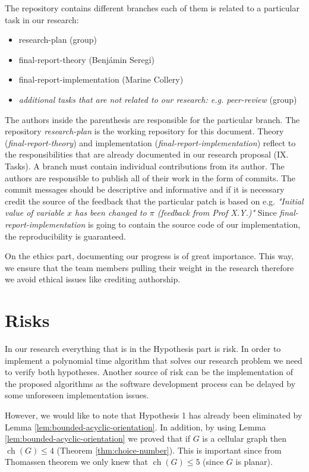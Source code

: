 \documentclass[letterpaper, 10 pt, conference]{ieeeconf}  %
\DeclareMathOperator*{\ch}{ch}
\begin{document}
The repository contains different branches each of them is related to a particular task in our research:
\begin{itemize}
\item research-plan (group)
\item final-report-theory (Benjámin Seregi)
\item final-report-implementation (Marine Collery)
\item \textit{additional tasks that are not related to our research: e.g. peer-review} (group)
\end{itemize}
The authors inside the parenthesis are responsible for the particular branch. The repository \textit{research-plan} is the working repository for this document. Theory (\textit{final-report-theory}) and implementation (\textit{final-report-implementation}) reflect to the responsibilities that are already documented in our research proposal (IX. Tasks).
A branch must contain individual contributions from its author. The authors are responsible to publish all of their work in the form of commits. The commit messages should be descriptive and informative and if it is necessary credit the source of the feedback that the particular patch is based on e.g. \textit{"Initial value of variable $x$ has been changed to $\pi$ (feedback from Prof X.Y.)"}
Since \textit{final-report-implementation} is going to contain the source code of our implementation, the reproducibility is guaranteed.

On the ethics part, documenting our progress is of great importance. This way, we ensure that the team members pulling their weight in the research therefore we avoid ethical issues like crediting authorship.


\section{Risks}
In our research everything that is in the Hypothesis part is risk. In order to implement a polynomial time algorithm that solves our research problem we need to verify both hypotheses. Another source of risk can be the implementation of the proposed algorithms as the software development process can be delayed by some unforeseen implementation issues.

However, we would like to note that Hypothesis 1 has already been eliminated by Lemma \ref{lem:bounded-acyclic-orientation}. In addition, by using Lemma \ref{lem:bounded-acyclic-orientation} we proved that if $G$ is a cellular graph then $\ch(G) \leqslant 4$ (Theorem \ref{thm:choice-number}). This is important since from Thomassen theorem \cite{Thomassen:1994:PG:184180.184192} we only knew that $\ch(G) \leqslant 5$ (since $G$ is planar).
\end{document}
